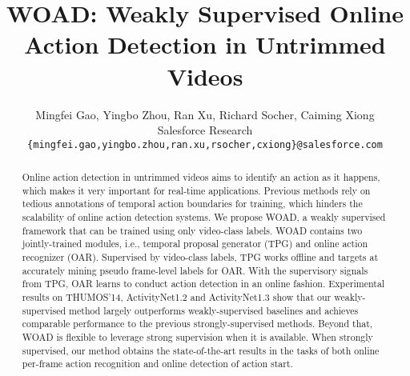 \documentclass[final]{cvpr}
\begin{document}
\title{WOAD: Weakly Supervised Online Action Detection in Untrimmed Videos}

\author{Mingfei Gao, Yingbo Zhou, Ran Xu, Richard Socher, Caiming Xiong\\
Salesforce Research\\
{\tt\small \{mingfei.gao,yingbo.zhou,ran.xu,rsocher,cxiong\}@salesforce.com}
}

\maketitle


\begin{abstract}
Online action detection in untrimmed videos aims to identify an action as it happens, which makes it very important for real-time applications. Previous methods rely on tedious annotations of temporal action boundaries for training, which hinders the scalability of online action detection systems. We propose WOAD, a weakly supervised framework that can be trained using only video-class labels. WOAD contains two jointly-trained modules, i.e., temporal proposal generator (TPG) and online action recognizer (OAR). Supervised by video-class labels, TPG works offline and targets at accurately mining pseudo frame-level labels for OAR. With the supervisory signals from TPG, OAR learns to conduct action detection in an online fashion. Experimental results on THUMOS'14, ActivityNet1.2 and ActivityNet1.3 show that our weakly-supervised method largely outperforms weakly-supervised baselines and achieves comparable performance to the previous strongly-supervised methods. Beyond that, WOAD is flexible to leverage strong supervision when it is available. When strongly supervised, our method obtains the state-of-the-art results in the tasks of both online per-frame action recognition and online detection of action start.
\end{abstract}
\end{document}
